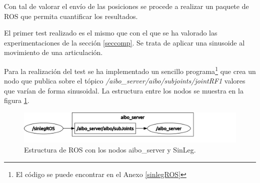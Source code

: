 \documentclass[12pt,a4paper,final,twoside]{book}
\begin{document}
Con tal de valorar el envío de las posiciones se procede a realizar un paquete de ROS que permita cuantificar los resultados.

El primer test realizado es el mismo que con el que se ha valorado las experimentaciones de la sección \ref{seccomp}. Se trata de aplicar una sinusoide al movimiento de una articulación.

Para la realización del test se ha implementado un sencillo programa\footnote{El código se puede encontrar en el Anexo \ref{sinlegROS}} que crea un nodo que publica sobre el tópico \textit{/aibo{\_}server/aibo/subjoints/jointRF1} valores que varían de forma sinusoidal. 
La estructura entre los nodos se muestra en la figura \ref{fig:ASSL}.
\begin{figure}[H]
	\centering
    \includegraphics[scale=0.35]{images/rosgraphASsin.pdf}
	 \caption{Estructura de ROS con los nodos aibo\_server y SinLeg.}
  \label{fig:ASSL}
\end{figure}
\end{document}
